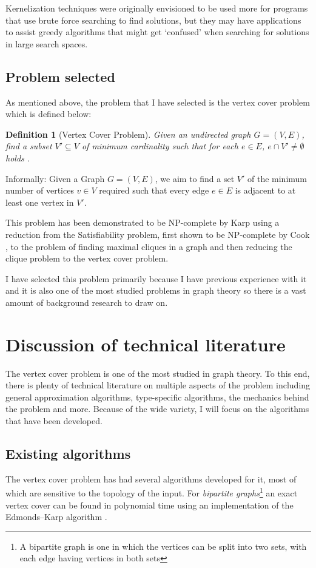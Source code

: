 \documentclass[11pt]{article}
\newtheorem{definition}{Definition}
\theoremstyle{definition}
\begin{document}
        Kernelization techniques were originally envisioned to be used more for programs that use brute force searching to
        find  solutions, but
        they may have applications to assist greedy algorithms that might get `confused' when searching for
        solutions in large search spaces.  
         

    \subsection{Problem selected} \label{sec:VertexC}
      As mentioned above, the problem that I have selected is the vertex cover problem which is defined below:
      \begin{definition}[Vertex Cover Problem] \label{defVC}
         Given an undirected graph $G = (V,E)$, find
        a subset $V' \subseteq V $ of minimum cardinality such that for each $e \in E$, $ e \cap V' \neq \emptyset$ holds \cite{paper:hybrid}. 
      \end{definition} 
      Informally: Given a Graph $G = (V,E)$, we aim to find a set $V'$ of the minimum number of
      vertices $v \in V$ required such that every edge $e \in E$ is adjacent to at least one vertex in $V'$.

      This problem has been demonstrated to be NP-complete by Karp \cite{citeulike:Karp} using a reduction from 
      the Satisfiability problem, first shown to be NP-complete by Cook \cite{citeulike:Cook}, to the problem of
      finding maximal cliques in a graph and then reducing the clique problem to the vertex cover problem.
      
      I have selected this problem primarily because I have previous experience with it and it
      is also one of the most studied problems in graph theory so there is a vast amount of background research
      to draw on.

            
  \section{Discussion of technical literature}
    The vertex cover problem is one of the most studied in graph theory. To this end, there is plenty of 
    technical literature on multiple aspects of the problem including general approximation algorithms,
    type-specific algorithms, the mechanics behind the problem and more. Because of the wide variety, I will focus
    on the algorithms that have been developed.

    \subsection{Existing algorithms}
      The vertex cover problem has had several algorithms developed for it, most of which are sensitive to the topology
      of the input. For \emph{bipartite graphs}\footnote{A bipartite graph is one in which the vertices can be split into
      two sets, with each edge having vertices in both sets} an exact vertex cover can be found in polynomial time using an
      implementation of the Edmonds--Karp algorithm \cite{Ed-Karp}.
\end{document}
